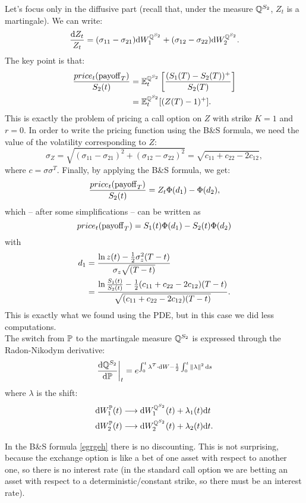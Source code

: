 Let's focus only in the diffusive part (recall that, under the measure $\mathbb{Q}^{S_2}$, $Z_t$ is a martingale). We can write:
\begin{equation}
    \frac{\dd Z_t}{Z_t} = (\sigma_{11}- \sigma_{21})\dd W_1^{\mathbb{Q}^{S_2}} + (\sigma_{12}- \sigma_{22})\dd W_2^{\mathbb{Q}^{S_2}}.
\end{equation}
The key point is that:
\begin{align}
    \frac{price_t(\operatorname{payoff}_T)}{S_2(t)} &= \mathbb{E}_t^{\mathbb{Q}^{S_2}} \left[\frac{(S_1(T)-S_2(T))^+}{S_2(T)}\right]\\
    &=
    \mathbb{E}_t^{\mathbb{Q}^{S_2}}[(Z(T)-1)^+].
\end{align}
This is exactly the problem of pricing a call option on $Z$ with strike $K=1$ and $r=0$. In order to write the pricing function using the B\&S formula, we need the value of the volatility corresponding to $Z$:
\begin{equation}
    \sigma_Z = \sqrt{(\sigma_{11}- \sigma_{21})^2 + (\sigma_{12}- \sigma_{22})^2} = \sqrt{c_{11}+c_{22}-2c_{12}},
\end{equation}
where $c=\sigma\sigma^T$. Finally, by applying the B\&S formula, we get:
\begin{equation}
    \frac{price_t(\operatorname{payoff}_T)}{S_2(t)} = Z_t\Phi(d_1) - \Phi(d_2),
\end{equation}
which -- after some simplifications -- can be written as
\begin{equation}\label{egrgeh}
    price_t(\operatorname{payoff}_T) = S_1(t)\Phi(d_1) - S_2(t)\Phi(d_2)
\end{equation}
with
\begin{align}
    \notag d_1 &= \dfrac{\ln z(t)-\frac{1}{2}\sigma_z^2(T-t)}{\sigma_z \sqrt{(T-t)}} \\
    &=
    \dfrac{\ln\frac{S_1(t)}{S_2(t)}-\frac{1}{2}(c_{11}+c_{22}-2c_{12})(T-t)}{\sqrt{(c_{11}+c_{22}-2c_{12})(T-t)}}.
\end{align}
This is exactly what we found using the PDE, but in this case we did less computations.\\
The switch from $\mathbb{P}$ to the martingale measure $\mathbb{Q}^{S_2}$ is expressed through the Radon-Nikodym derivative:
\begin{equation}\label{bsex}
    \eval{\frac{\dd\Qmeas^{S_2}}{\dd\Pmeas}}_t = e^{\int_0^t\lambda^T\cdot\dd W - \frac{1}{2}\int_0^t \norm{\lambda}^2\,\dd s}
\end{equation}
where $\lambda$ is the shift:
\begin{align}
    \dd W_1^{\mathbb{P}}(t) &\longrightarrow \dd W_1^{\mathbb{Q}^{S_2}}(t) + \lambda_1(t)\dd t\\
    \dd W_2^{\mathbb{P}}(t) &\longrightarrow \dd W_2^{\mathbb{Q}^{S_2}}(t) + \lambda_2(t)\dd t.
\end{align}
\begin{remark}
    In the B\&S formula \eqref{egrgeh} there is no discounting. This is not surprising, because the exchange option is like a bet of one asset with respect to another one, so there is no interest rate (in the standard call option we are betting an asset with respect to a deterministic/constant strike, so there must be an interest rate).
\end{remark}

